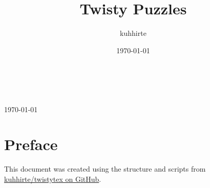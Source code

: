 \documentclass[12pt]{article}
\title{Twisty Puzzles}
\author{kuhhirte}
\date{\today}
\begin{document}
	
\begin{titlepage}
	
	\thispagestyle{empty}      %
	{\center
		{
			\LARGE\thetitle       %
			\\[5mm]               %
		 	\large\theauthor      %
		 	\\[5mm]               %
		 	\large\today          %
		 	\\[30mm]              %
		}
	}
	
	\tableofcontents
	
	\section*{Preface}
	
	This document was created using the structure and scripts from \href{https://github.com/kuhhirte/twistytex}{kuhhirte/twistytex on GitHub}.
\end{titlepage}



\nocite{*}
\printbibliography[heading=bibintoc]
\end{document}
